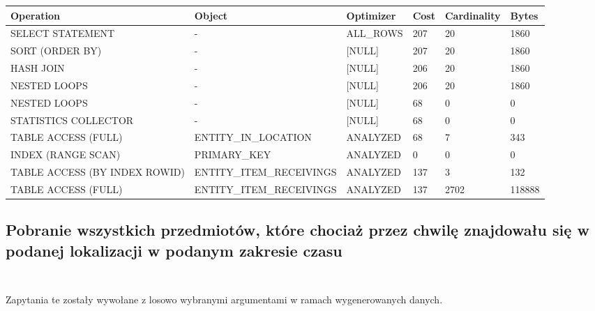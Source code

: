 \documentclass[11pt]{article}
\numberwithin{figure}{subsection}
\begin{document}
		\begin{tabularx}{\textwidth}{|X|X|X|X|X|X|}
Operation&Object&Optimizer&Cost&Cardinality&Bytes\\ \hline
SELECT STATEMENT& - &ALL\_ROWS&207&20&1860\\ \hline
SORT (ORDER BY)& - &[NULL]&207&20&1860\\ \hline
HASH JOIN& - &[NULL]&206&20&1860\\ \hline
NESTED LOOPS& - &[NULL]&206&20&1860\\ \hline
NESTED LOOPS& - &[NULL]&68&0&0\\ \hline
STATISTICS COLLECTOR& - &[NULL]&68&0&0\\ \hline
TABLE ACCESS (FULL)&ENTITY\_IN\_LOCATION&ANALYZED&68&7&343\\ \hline
INDEX (RANGE SCAN)&PRIMARY\_KEY&ANALYZED&0&0&0\\ \hline
TABLE ACCESS (BY INDEX ROWID)&ENTITY\_ITEM\_RECEIVINGS&ANALYZED&137&3&132\\ \hline
TABLE ACCESS (FULL)&ENTITY\_ITEM\_RECEIVINGS&ANALYZED&137&2702&118888\\ \hline
		\end{tabularx}
		
		
		
		
		
		
		
		
		
		
		
	
	\subsection{Pobranie wszystkich przedmiotów, które chociaż przez chwilę
	znajdowału się w podanej lokalizacji w podanym zakresie czasu}
			
		\begin{lstlisting}[caption={Wersja niezoptymalizowana},captionpos=b]
		\end{lstlisting}
			
		\begin{lstlisting}[caption={Wersja zoptymalizowana},captionpos=b]
		\end{lstlisting}
		
		Zapytania te zostały wywołane z losowo wybranymi argumentami w ramach
		wygenerowanych danych. \\
		
		\begin{lstlisting}[caption={Wywołanie zapytań}, captionpos=b]
		\end{lstlisting}
		
\end{document}
